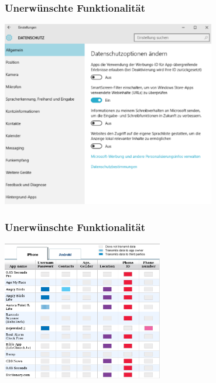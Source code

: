 \begin{frame}
    \frametitle{Unerwünschte Funktionalität}
    \begin{center}
      \includegraphics[width=0.7\textwidth]{../../img/windows10.png}
    \end{center}
\end{frame}

\begin{frame}
  \frametitle{Unerwünschte Funktionalität}
  \begin{center}
    \includegraphics[width=7cm]{../../img/backdoor-apps}
  \par\end{center}
\end{frame}
